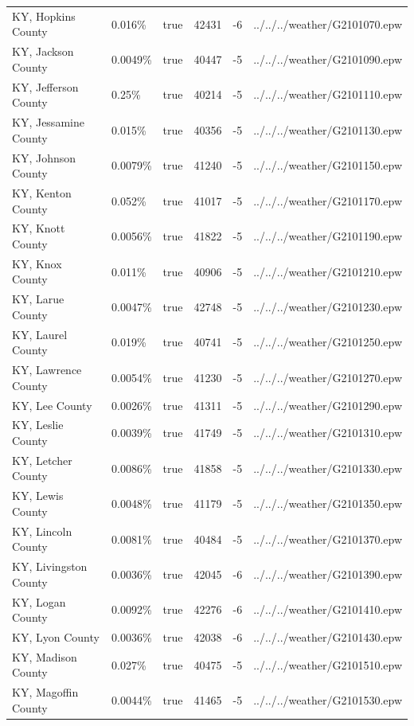 \begin{longtable}[]{@{}llllll@{}}
KY, Hopkins County & 0.016\% & true & 42431 & -6 &
../../../weather/G2101070.epw \\
KY, Jackson County & 0.0049\% & true & 40447 & -5 &
../../../weather/G2101090.epw \\
KY, Jefferson County & 0.25\% & true & 40214 & -5 &
../../../weather/G2101110.epw \\
KY, Jessamine County & 0.015\% & true & 40356 & -5 &
../../../weather/G2101130.epw \\
KY, Johnson County & 0.0079\% & true & 41240 & -5 &
../../../weather/G2101150.epw \\
KY, Kenton County & 0.052\% & true & 41017 & -5 &
../../../weather/G2101170.epw \\
KY, Knott County & 0.0056\% & true & 41822 & -5 &
../../../weather/G2101190.epw \\
KY, Knox County & 0.011\% & true & 40906 & -5 &
../../../weather/G2101210.epw \\
KY, Larue County & 0.0047\% & true & 42748 & -5 &
../../../weather/G2101230.epw \\
KY, Laurel County & 0.019\% & true & 40741 & -5 &
../../../weather/G2101250.epw \\
KY, Lawrence County & 0.0054\% & true & 41230 & -5 &
../../../weather/G2101270.epw \\
KY, Lee County & 0.0026\% & true & 41311 & -5 &
../../../weather/G2101290.epw \\
KY, Leslie County & 0.0039\% & true & 41749 & -5 &
../../../weather/G2101310.epw \\
KY, Letcher County & 0.0086\% & true & 41858 & -5 &
../../../weather/G2101330.epw \\
KY, Lewis County & 0.0048\% & true & 41179 & -5 &
../../../weather/G2101350.epw \\
KY, Lincoln County & 0.0081\% & true & 40484 & -5 &
../../../weather/G2101370.epw \\
KY, Livingston County & 0.0036\% & true & 42045 & -6 &
../../../weather/G2101390.epw \\
KY, Logan County & 0.0092\% & true & 42276 & -6 &
../../../weather/G2101410.epw \\
KY, Lyon County & 0.0036\% & true & 42038 & -6 &
../../../weather/G2101430.epw \\
KY, Madison County & 0.027\% & true & 40475 & -5 &
../../../weather/G2101510.epw \\
KY, Magoffin County & 0.0044\% & true & 41465 & -5 &
../../../weather/G2101530.epw \\

\end{longtable}
